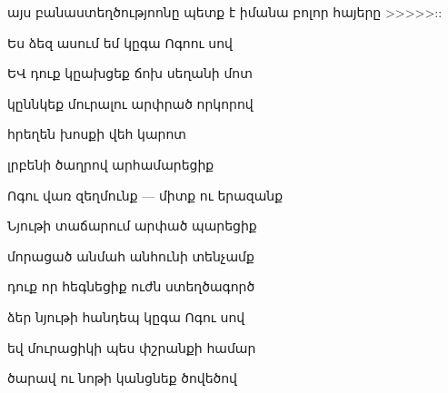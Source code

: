                                   

այս  բանաստեղծությոոնը  պետք է իմանա բոլոր հայերը >>>>>::




                                  Ես ձեզ ասում եմ կըգա Ոգոու սով

                                  ԵՎ դուք կըախցեք  ճոխ սեղանի մոտ


                                  կըննկեք մուրալու արփրած որկորով


                                  հրեղեն խոսքի վեհ կարոտ


                                  լրբենի ծաղրով արհամարեցիք


                                  Ոգու վառ զեղմունք --- միտք ու երազանք



                                  Նյութի տաճարում  արփած պարեցիք



                                  մորացած անմահ անհունի տենչամք


                                  դուք որ հեգնեցիք  ուժն ստեղծագործ


                             ձեր   նյութի հանդեպ կըգա Ոգու սով


                            եվ մուրացիկի պես փշրանքի   համար


                            ծարավ ու նոթի կանցնեք ծովեծով
                                  
